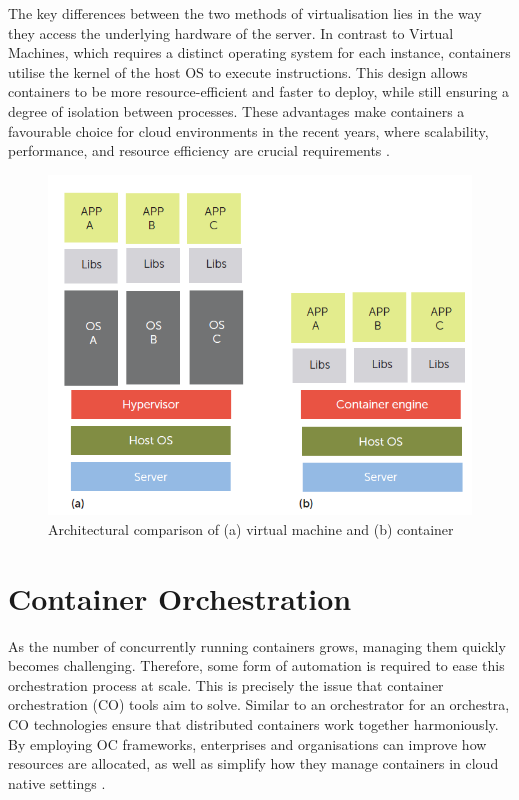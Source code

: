 The key differences between the two methods of virtualisation lies in the way they access the underlying hardware of the server. In contrast to Virtual Machines, which requires a distinct operating system for each instance, containers utilise the kernel of the host OS to execute instructions. This design allows containers to be more resource-efficient and faster to deploy, while still ensuring a degree of isolation between processes. These advantages make containers a favourable choice for cloud environments in the recent years, where scalability, performance, and resource efficiency are crucial requirements \cite{bernsteinContainersCloudLXC2014, felterUpdatedPerformanceComparison2015}.

\begin{figure}
    \centering
    \includegraphics[width=0.7\linewidth]{resources/eea3da004befcc5437960cbc868be634.png}
    \caption{Architectural comparison of (a) virtual machine and (b) container \cite{bernsteinContainersCloudLXC2014}}
    \label{fig:vms-vs-containers}
\end{figure}

\section{Container Orchestration}

As the number of concurrently running containers grows, managing them quickly becomes challenging. Therefore, some form of automation is required to ease this orchestration process at scale. This is precisely the issue that container orchestration (CO) tools aim to solve. Similar to an orchestrator for an orchestra, CO technologies ensure that distributed containers work together harmoniously. By employing OC frameworks, enterprises and organisations can improve how resources are allocated, as well as simplify how they manage containers in cloud native settings \cite{truyenComprehensiveFeatureComparison2019}.

